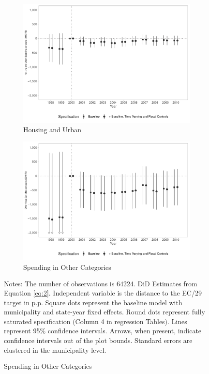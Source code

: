 \begin{figure}[h!]
\begin{center}
\begin{subfigure}{0.48\textwidth}
        \caption{\scriptsize Housing and Urban}\label{fig:8e}
        \includegraphics[width=\textwidth]{plots/finbra_desp_hab_urb_pcapita_dist_ec29_baseline_dist_ec29_baseline_8.pdf}
    \end{subfigure}
    \begin{subfigure}{0.48\textwidth}
        \centering
        \caption{\scriptsize Spending in Other Categories}\label{fig:8f}
        \includegraphics[width=\textwidth]{plots/finbra_desp_outros_area_pcapita_dist_ec29_baseline_dist_ec29_baseline_8.pdf}
    \end{subfigure}
    
    \end{center}
    \scriptsize{Notes: The number of observations is 64224. DiD Estimates from Equation \ref{eq:2}. Independent variable is the distance to the EC/29 target in p.p. Square dots represent the baseline model with municipality and state-year fixed effects. Round dots represent fully saturated specification (Column 4 in regression Tables). Lines represent 95\% confidence intervals. Arrows, when present, indicate confidence intervals out of the plot bounds. Standard errors are clustered in the municipality level.}
    
\end{figure}